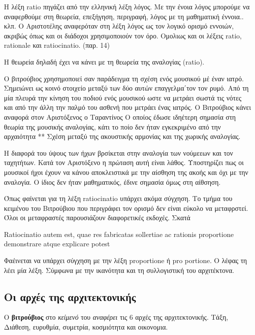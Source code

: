  Η λέξη ratio πηγάζει από την ελληνική λέξη λόγος. Με την ένοια λόγος μπορούμε να αναφερθούμε στη θεωρεία, επεξήγηση, περιγραφή, λόγος με τη μαθηματική έννοια.. κλπ. Ο Αριστοτέλης αναφερόταν στη λέξη λόγος ως τον λογικό ορισμό εννοιών, ακριβώς όπως και οι διάδοχοι χρησιμοποιούν τον όρο. Ομολιως και οι λέξεις ratio, rationale και ratiocinatio. (παρ. 14)
 
 Η θεωρεία δηλαδή έχει να κάνει με τη θεωρεία της αναλογίας (ratio). 
 
 Ο βιτρούβιος χρησημοποιεί σαν παράδειγμα τη σχέση ενός μουσικού μέ έναν ιατρό. Σημειώνει ως κοινό στοιχείο μεταξύ των δύο αυτών επαγγελμα΄τον τον ρυμό. Από τη μία πλευρά την κίνηση του ποδιού ενός μουσικού ωστε να μετράει σωστά τις νότες και από την άλλη την παλμό του ασθενή που μετράει ένας ιατρός. Ο Βιτρούβιος κάνει αναφορά στον Αριστόξενος ο Ταραντίνος Ο οποίος έδωσε ιδηέτερη σημασία στη θεωρία της μουσικής αναλογίας, κάτι το ποίο δεν ήταν εγκεκριμένο από την αρχαιότητα ** Σχέση μεταξύ της ακουστικής αρμονίας και της χωρικής αναλογίας. 
 
 Η διαφορά του ύψους των ήχων βρσίκεται στην αναλογία των νούμεεων και τον ταχητήτων. Κατά τον Αριστόξενο η πρώταση αυτή είναι λάθος. Υποστηρίζει πως οι μουσικοί ήχοι έχουν να κάνου αποκλειστικά με την αίσθηση της ακοής και όχι με την αναλογία. Ο ίδιος δεν ήταν μαθηματικός, έδινε σημασία όμως στη αίθσηση. 
 
 Όπως φαίνεται για τη λέξη ratiocinatio υπάρχει ακόμα σύγχηση. Το τμήμα του κειμένου του Βιτρούβιου που περιγράφει τον ορισμό δεν είναι εύκολο να μεταφρστεί. Όλοι οι μεταφραστές παρουσιάζουν διαφορετικές εκδοχές. Σκατά
 
  Ratiocinatio autem est, quae res fabricatas sollertiae ac rationis proportione demonstrare atque explicare potest
  
  Φαέινεται να υπάρχει σύγχηση με την λέξη proportione ή pro portione. Ο λέφας τη λέει μία λέξη. 
  Σύμφωνα με την ικανότητα και τη συλλογιστική του αρχιτέκτονα.
  
\subsection{Οι αρχές της αρχιτεκτονικής}
  
  Ο {\color{red}\textbf{βιτρούβιος}} στο \emph{κείμενό} του \textit{αναφέρει} τις 6 αρχές της αρχιτεκτονικής. Τάξη, Διάθεση, ευρυθμία, συμετρία, κοσμιότητα και οικονομια. \cite{scranton_vitruvius_1974, vitruvius-lefas}
  
